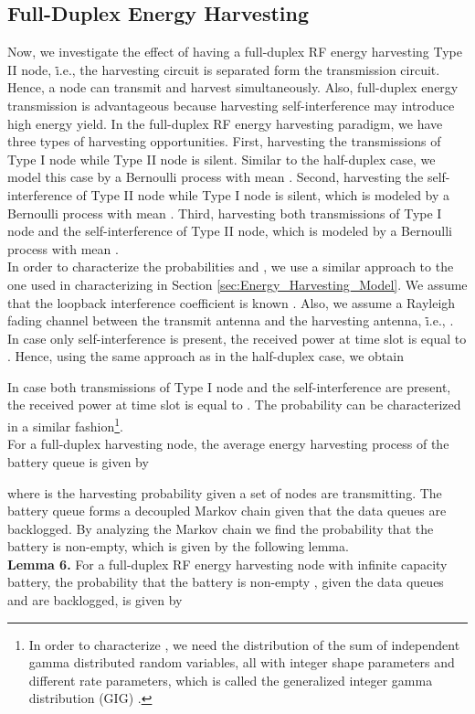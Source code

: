 \documentclass[draftcls,12pt,onecolumn]{IEEEtran}
\begin{document}
\subsection{Full-Duplex Energy Harvesting}
Now, we investigate the effect of having a full-duplex RF energy harvesting Type II node, \.i.e., the harvesting circuit is separated form the transmission circuit. Hence, a node can transmit and harvest simultaneously. Also, full-duplex energy transmission is advantageous because harvesting self-interference may introduce high energy yield. In the full-duplex RF energy harvesting paradigm, we have three types of harvesting opportunities. First, harvesting the transmissions of Type I node while Type II node is silent. Similar to the half-duplex case, we model this case by a Bernoulli process with mean . Second, harvesting the self-interference of Type II node while Type I node is silent, which is modeled by a Bernoulli process with mean . Third,  harvesting both transmissions of Type I node and the self-interference of Type II node, which is modeled by a Bernoulli process with mean .\\
\indent In order to characterize the probabilities  and , we use a similar approach to the one used in characterizing  in Section \ref{sec:Energy_Harvesting_Model}. We assume that the loopback interference coefficient  is known \cite{thangaraj2012self}. Also, we assume a Rayleigh fading channel between the transmit antenna and the harvesting antenna, \.i.e., . In case only self-interference is present, the received power at time slot  is equal to . Hence, using the same approach as in the half-duplex case, we obtain

In case both transmissions of Type I node and the self-interference are present, the received power at time slot  is equal to . The probability  can be characterized in a similar fashion\footnote{In order to characterize , we need the distribution of the sum of independent gamma distributed random variables, all with integer shape parameters and different rate parameters, which is called the generalized integer gamma distribution (GIG) \cite{coelho1998generalized}.}.\\
\indent For a full-duplex harvesting node, the average energy harvesting process of the battery queue is given by 

where  is the harvesting probability given a set  of nodes are transmitting. The battery queue forms a decoupled Markov chain given that the data queues are backlogged. By analyzing the Markov chain we find the probability that the battery is non-empty, which is given by the following lemma.\\
\indent \textbf{Lemma 6.} For a full-duplex RF energy harvesting node with infinite capacity battery, the probability that the battery is non-empty , given the data queues  and  are backlogged, is given by 
 
\end{document}
